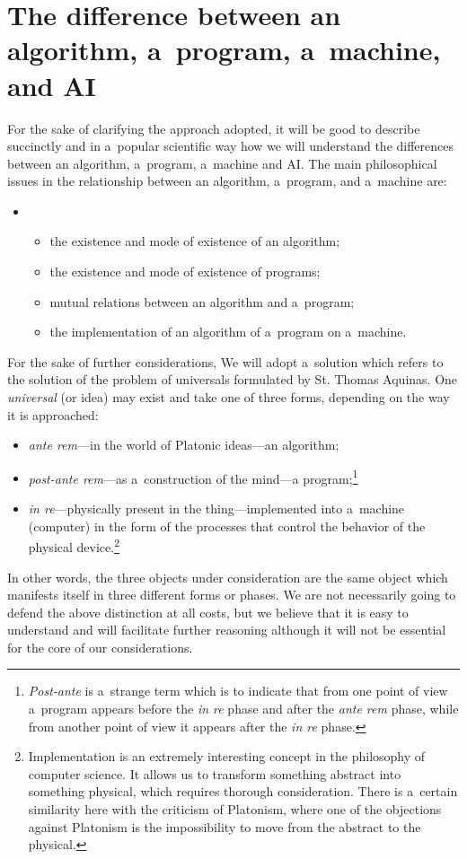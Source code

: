 \section{The difference between an algorithm, a~program, a~machine, and AI}
For the sake of clarifying the approach adopted, it will be good to describe succinctly and in a~popular scientific way how we will understand the differences between an algorithm, a~program, a~machine and AI. The main philosophical issues in the relationship between an algorithm, a~program, and a~machine are:

\begin{itemize}
\item \begin{itemize}
\item the existence and mode of existence of an algorithm;
\item the existence and mode of existence of programs;
\item mutual relations between an algorithm and a~program;
\item the implementation of an algorithm of a~program on a~machine.
\end{itemize}
\end{itemize}
For the sake of further considerations, We will adopt a~solution which refers to the solution of the problem of universals formulated by St. Thomas Aquinas. One \textit{universal} (or idea) may exist and take one of three forms, depending on the way it is approached:

\begin{itemize}
\item \textit{ante rem}—in the world of Platonic ideas—an algorithm;
\item \textit{post-ante rem}—as a~construction of the mind—a program;\footnote{ \textit{Post-ante} is a~strange term which is to indicate that from one point of view a~program appears before the \textit{in re} phase and after the \textit{ante rem} phase, while from another point of view it appears after the \textit{in re} phase.}
\item \textit{in re}—physically present in the thing—implemented into a~machine (computer) in the form of the processes that control the behavior of the physical device.\footnote{ Implementation is an extremely interesting concept in the philosophy of computer science. It allows us to transform something abstract into something physical, which requires thorough consideration. There is a~certain similarity here with the criticism of Platonism, where one of the objections against Platonism is the impossibility to move from the abstract to the physical.}
\end{itemize}
In other words, the three objects under consideration are the same object which manifests itself in three different forms or phases. We are not necessarily going to defend the above distinction at all costs, but we believe that it is easy to understand and will facilitate further reasoning although it will not be essential for the core of our considerations.

